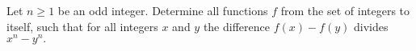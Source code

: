 Let 
$n \geq 1$
 be an odd integer. Determine all functions 
$f$
 from the set of integers to itself, such that for all integers 
$x$
 and 
$y$
 the difference 
$f(x)-f(y)$
 divides 
$x^n-y^n.$
